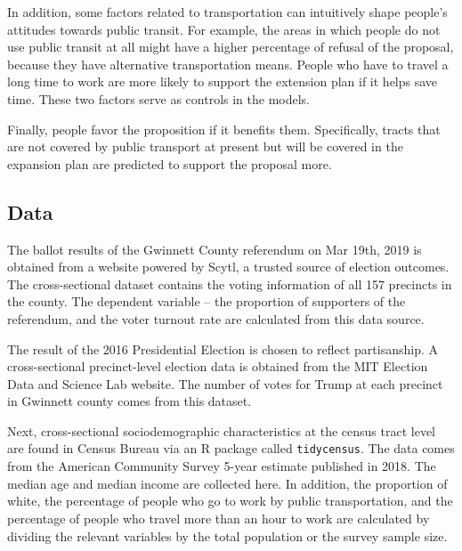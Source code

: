 \documentclass[
]{article}
\begin{document}
In addition, some factors related to transportation can intuitively
shape people's attitudes towards public transit. For example, the areas
in which people do not use public transit at all might have a higher
percentage of refusal of the proposal, because they have alternative
transportation means. People who have to travel a long time to work are
more likely to support the extension plan if it helps save time. These
two factors serve as controls in the models.

Finally, people favor the proposition if it benefits them. Specifically,
tracts that are not covered by public transport at present but will be
covered in the expansion plan are predicted to support the proposal
more.

\hypertarget{data}{%
\subsection{Data}\label{data}}

The ballot results of the Gwinnett County referendum on Mar 19th, 2019
is obtained from a website powered by Scytl, a trusted source of
election outcomes. The cross-sectional dataset contains the voting
information of all 157 precincts in the county. The dependent variable
-- the proportion of supporters of the referendum, and the voter turnout
rate are calculated from this data source.

The result of the 2016 Presidential Election is chosen to reflect
partisanship. A cross-sectional precinct-level election data is obtained
from the MIT Election Data and Science Lab website. The number of votes
for Trump at each precinct in Gwinnett county comes from this dataset.

Next, cross-sectional sociodemographic characteristics at the census
tract level are found in Census Bureau via an R package called
\texttt{tidycensus}. The data comes from the American Community Survey
5-year estimate published in 2018. The median age and median income are
collected here. In addition, the proportion of white, the percentage of
people who go to work by public transportation, and the percentage of
people who travel more than an hour to work are calculated by dividing
the relevant variables by the total population or the survey sample
size.
\end{document}
